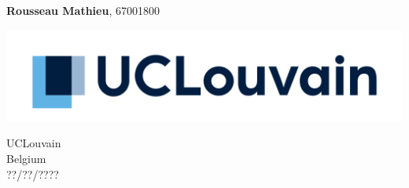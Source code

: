 \begin{titlepage}
	\begin{center}
	  \vspace*{1cm}
		  
	  \Huge
	  \textbf{}
		  
	  \vspace{0.5cm}
	  \LARGE
		  
	  \vspace{2.5cm}
	  
	  \Large
	  \textbf{Rousseau Mathieu}, 67001800
		  
	  \vfill
		  
	  \vspace{0.8cm}
		  
	  \includegraphics[width=\textwidth]{figures/logo_ucl.png}
  
	  \vspace{0.8cm}
		  
	  \Large
	  UCLouvain \\
	  Belgium \\
	  ??/??/????
	\end{center}
  \end{titlepage}